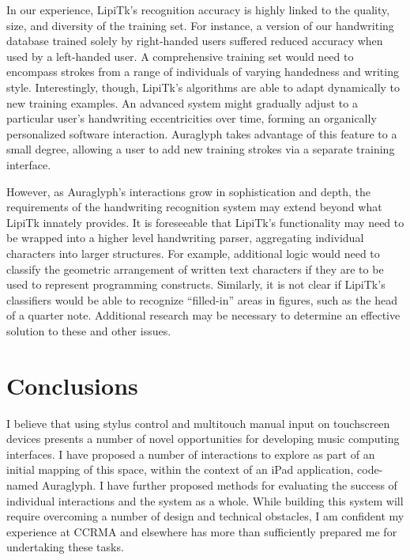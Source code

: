 \documentclass[10pt,letterpaper]{article}
\begin{document}
In our experience, LipiTk's recognition accuracy is highly linked to the quality, size, and diversity of the training set. 
For instance, a version of our handwriting database trained solely by right-handed users suffered reduced accuracy when used by a left-handed user. 
A comprehensive training set would need to encompass strokes from a range of individuals of varying handedness and writing style. 
Interestingly, though, LipiTk's algorithms are able to adapt dynamically to new training examples. 
An advanced system might gradually adjust to a particular user's handwriting eccentricities over time, forming an organically personalized software interaction. 
Auraglyph takes advantage of this feature to a small degree, allowing a user to add new training strokes via a separate training interface. 

However, as Auraglyph's interactions grow in sophistication and depth, the requirements of the handwriting recognition system may extend beyond what LipiTk innately provides. 
It is foreseeable that LipiTk's functionality may need to be wrapped into a higher level handwriting parser, aggregating individual characters into larger structures. 
For example, additional logic would need to classify the geometric arrangement of written text characters if they are to be used to represent programming constructs. 
Similarly, it is not clear if LipiTk's classifiers would be able to recognize ``filled-in'' areas in figures, such as the head of a quarter note. 
Additional research may be necessary to determine an effective solution to these and other issues. 

\section{Conclusions}
\label{sec:Conclusions}

I believe that using stylus control and multitouch manual input on touchscreen devices presents a number of novel opportunities for developing music computing interfaces. 
I have proposed a number of interactions to explore as part of an initial mapping of this space, within the context of an iPad application, code-named Auraglyph. 
I have further proposed methods for evaluating the success of individual interactions and the system as a whole. 
While building this system will require overcoming a number of design and technical obstacles, I am confident my experience at CCRMA and elsewhere has more than sufficiently prepared me for undertaking these tasks. 


%

%
%


\end{document}

